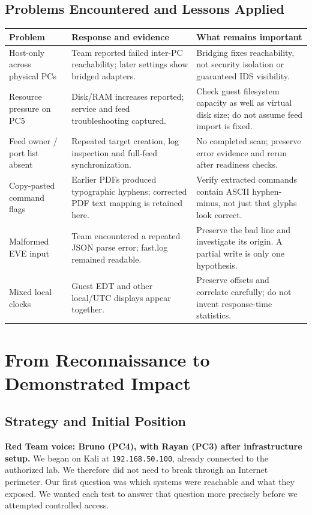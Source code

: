 \documentclass[11pt,a4paper]{article}
\newcommand{\partheading}[2]{\clearpage\noindent{\small\bfseries\color{steel}#1}\par\section{#2}}
\begin{document}
\subsection{Problems Encountered and Lessons Applied}
\begin{tabularx}{\linewidth}{@{}L{3.1cm}X X@{}}
\toprule
\textbf{Problem} & \textbf{Response and evidence} & \textbf{What remains important}\\
\midrule
Host-only across physical PCs & Team reported failed inter-PC reachability; later settings show bridged adapters. & Bridging fixes reachability, not security isolation or guaranteed IDS visibility.\\
Resource pressure on PC5 & Disk/RAM increases reported; service and feed troubleshooting captured. & Check guest filesystem capacity as well as virtual disk size; do not assume feed import is fixed.\\
Feed owner / port list absent & Repeated target creation, log inspection and full-feed synchronization. & No completed scan; preserve error evidence and rerun after readiness checks.\\
Copy-pasted command flags & Earlier PDFs produced typographic hyphens; corrected PDF text mapping is retained here. & Verify extracted commands contain ASCII hyphen-minus, not just that glyphs look correct.\\
Malformed EVE input & Team encountered a repeated JSON parse error; fast.log remained readable. & Preserve the bad line and investigate its origin. A partial write is only one hypothesis.\\
Mixed local clocks & Guest EDT and other local/UTC displays appear together. & Preserve offsets and correlate carefully; do not invent response-time statistics.\\
\bottomrule
\end{tabularx}

\partheading{04 / EXERCISE SEQUENCE}{From Reconnaissance to Demonstrated Impact}
\label{sec:red}
\subsection{Strategy and Initial Position}
\textbf{Red Team voice: Bruno (PC4), with Rayan (PC3) after infrastructure setup.} We began on Kali at \texttt{192.168.50.100}, already connected to the authorized lab. We therefore did not need to break through an Internet perimeter. Our first question was which systems were reachable and what they exposed. We wanted each test to answer that question more precisely before we attempted controlled access.
\end{document}

